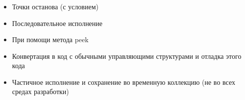 \begin{frame}
\frametitle{\insertsection} 
\framesubtitle{\insertsubsection}
\begin{itemize}
	\item Точки останова (с условием)
	\item Последовательное исполнение
	\item При помощи метода peek
	\item Конвертация в код с обычными управляющими структурами и отладка этого кода
	\item Частичное исполнение и сохранение во временную коллекцию (не во всех средах разработки)
\end{itemize}
\end{frame}
